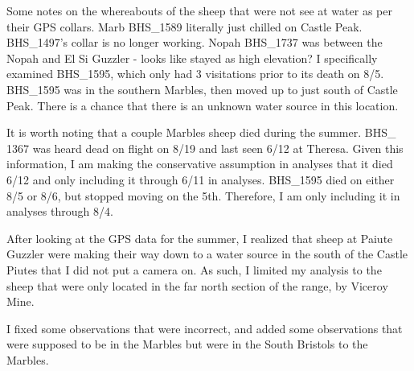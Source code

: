 \documentclass[]{article}
\begin{document}
Some notes on the whereabouts of the sheep that were not see at water as
per their GPS collars. Marb BHS\_1589 literally just chilled on Castle
Peak. BHS\_1497's collar is no longer working. Nopah BHS\_1737 was
between the Nopah and El Si Guzzler - looks like stayed as high
elevation? I specifically examined BHS\_1595, which only had 3
visitations prior to its death on 8/5. BHS\_1595 was in the southern
Marbles, then moved up to just south of Castle Peak. There is a chance
that there is an unknown water source in this location.

It is worth noting that a couple Marbles sheep died during the summer.
BHS\_ 1367 was heard dead on flight on 8/19 and last seen 6/12 at
Theresa. Given this information, I am making the conservative assumption
in analyses that it died 6/12 and only including it through 6/11 in
analyses. BHS\_1595 died on either 8/5 or 8/6, but stopped moving on the
5th. Therefore, I am only including it in analyses through 8/4.

After looking at the GPS data for the summer, I realized that sheep at
Paiute Guzzler were making their way down to a water source in the south
of the Castle Piutes that I did not put a camera on. As such, I limited
my analysis to the sheep that were only located in the far north section
of the range, by Viceroy Mine.

I fixed some observations that were incorrect, and added some
observations that were supposed to be in the Marbles but were in the
South Bristols to the Marbles.
\end{document}
